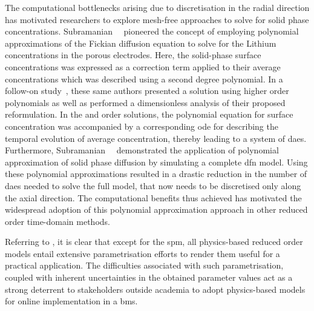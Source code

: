 The  computational  bottlenecks arising  due  to  discretisation in  the  radial
direction has motivated researchers to explore mesh-free approaches to solve for
solid  phase concentrations.  Subramanian~\etal~\cite{Subramanian2004} pioneered
the  concept of  employing polynomial  approximations of  the Fickian  diffusion
equation to solve for the Lithium concentrations in the porous electrodes. Here,
the  solid-phase  surface concentrations  was  expressed  as a  correction  term
applied  to their  average concentrations  which  was described  using a  second
degree  polynomial.  In  a follow-on  study~\cite{Subramanian2005},  these  same
authors  presented  a  solution  using  higher  order  polynomials  as  well  as
performed  a dimensionless  analysis  of their  proposed  reformulation. In  the
 and   order solutions, the  polynomial equation
for  surface concentration  was  accompanied by  a  corresponding \gls{ode}  for
describing the temporal evolution of average concentration, thereby leading to a
system  of  \gls{dae}s. Furthermore,  Subramanian~\etal{}~\cite{Subramanian2007}
demonstrated  the  application  of   polynomial  approximation  of  solid  phase
diffusion  by simulating  a  complete \gls{dfn}  model.  Using these  polynomial
approximations  resulted in  a drastic  reduction  in the  number of  \gls{dae}s
needed to solve the full model, that  now needs to be discretised only along the
axial  direction. The  computational benefits  thus achieved  has motivated  the
widespread adoption of  this polynomial approximation approach  in other reduced
order time-domain methods.


Referring  to  ,  it  is  clear that  except  for
the  \gls{spm},   all  physics-based  reduced  order   models  entail  extensive
parametrisation efforts   to render  them useful for a  practical application.
The  difficulties associated  with such  parametrisation, coupled  with inherent
uncertainties  in  the obtained  parameter  values  act  as a  strong  deterrent
to  stakeholders  outside academia  to  adopt  physics-based models  for  online
implementation in a \gls{bms}.




